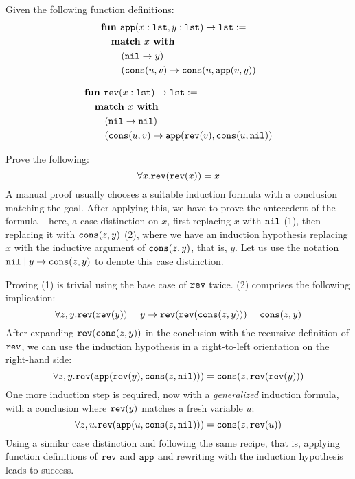 \begin{example}\label{ex:1}
Given the following function definitions:
\begin{equation}
\begin{aligned}
\nonumber
&\textbf{fun } \append (x : \lst, y : \lst) \rightarrow \lst :=\\
&\tab\textbf{match } x \textbf{ with}\\
&\tab\tab(\nil\rightarrow y)\\ &\tab\tab(\cons(u,v)\rightarrow\cons(u,\append(v,y))\end{aligned}\end{equation}

\dotfill
\begin{equation}
\begin{aligned}
\nonumber
&\textbf{fun } \rev (x : \lst) \rightarrow \lst :=\\
&\tab\textbf{match } x \textbf{ with}\\
&\tab\tab(\nil\rightarrow \nil)\\ &\tab\tab(\cons(u,v)\rightarrow\append(\rev(v),\cons(u,\nil))\end{aligned}\end{equation}

Prove the following:
$$\forall x. \mathtt{rev}(\mathtt{rev}(x))=x$$
A manual proof usually chooses a suitable induction formula with a conclusion matching the goal. After applying this, we have to prove the antecedent of the formula -- here, a case distinction on $x$, first replacing $x$ with $\mathtt{nil}$ (1), then replacing it with $\mathtt{cons}(z,y)$ (2), where we have an induction hypothesis replacing $x$ with the inductive argument of $\mathtt{cons}(z,y)$, that is, $y$. Let us use the notation $\mathtt{nil} \mid y\rightarrow\mathtt{cons}(z,y)$ to denote this case distinction.

Proving (1) is trivial using the base case of $\mathtt{rev}$ twice. (2) comprises the following implication:
$$\forall z,y.\mathtt{rev}(\mathtt{rev}(y))=y\rightarrow\mathtt{rev}(\mathtt{rev}(\mathtt{cons}(z,y)))=\mathtt{cons}(z,y)$$
After expanding $\mathtt{rev}(\mathtt{cons}(z,y))$ in the conclusion with the recursive definition of $\mathtt{rev}$, we can use the induction hypothesis in a right-to-left orientation on the right-hand side:
$$\forall z,y.\mathtt{rev}(\mathtt{app}(\mathtt{rev}(y),\mathtt{cons}(z,\mathtt{nil})))=\mathtt{cons}(z,\mathtt{rev}(\mathtt{rev}(y)))$$
One more induction step is required, now with a \textit{generalized} induction formula, with a conclusion where $\mathtt{rev}(y)$ matches a fresh variable $u$:
$$\forall z,u.\mathtt{rev}(\mathtt{app}(u,\mathtt{cons}(z,\mathtt{nil})))=\mathtt{cons}(z,\mathtt{rev}(u))$$
Using a similar case distinction and following the same recipe, that is, applying function definitions of $\mathtt{rev}$ and $\mathtt{app}$ and rewriting with the induction hypothesis leads to success.
\end{example}

